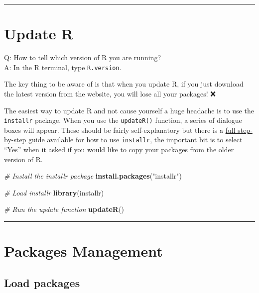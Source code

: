 \documentclass[
  a4paper,
  twoside,
  openright]{book}
\newenvironment{Shaded}{\begin{snugshade}}{\end{snugshade}}
\newcommand{\CommentTok}[1]{\textcolor[rgb]{0.56,0.35,0.01}{\textit{#1}}}
\newcommand{\FunctionTok}[1]{\textcolor[rgb]{0.13,0.29,0.53}{\textbf{#1}}}
\newcommand{\NormalTok}[1]{#1}
\newcommand{\StringTok}[1]{\textcolor[rgb]{0.31,0.60,0.02}{#1}}
\theoremstyle{definition}
\theoremstyle{definition}
\theoremstyle{definition}
\theoremstyle{definition}
\theoremstyle{remark}
\begin{document}
\begin{center}\rule{0.5\linewidth}{0.5pt}\end{center}

\section{Update R}\label{update-r}

Q: How to tell which version of R you are running?\\
A: In the R terminal, type \texttt{R.version}.

The key thing to be aware of is that when you update R, {if you just download the latest version from the website, you will lose all your packages!} ❌

The easiest way to update R and not cause yourself a huge headache is to use the \texttt{installr} package. When you use the \texttt{updateR()} function, a series of dialogue boxes will appear. These should be fairly self-explanatory but there is a \href{https://www.r-statistics.com/2015/06/a-step-by-step-screenshots-tutorial-for-upgrading-r-on-windows/\#google_vignette}{full step-by-step guide} available for how to use \texttt{installr}, the important bit is to {select ``Yes'' when it asked if you would like to copy your packages from the older version of R}.

\begin{Shaded}
\begin{Highlighting}[]
\CommentTok{\# Install the installr package}
\FunctionTok{install.packages}\NormalTok{(}\StringTok{"installr"}\NormalTok{)}

\CommentTok{\# Load installr}
\FunctionTok{library}\NormalTok{(installr)}

\CommentTok{\# Run the update function}
\FunctionTok{updateR}\NormalTok{()}
\end{Highlighting}
\end{Shaded}

\begin{center}\rule{0.5\linewidth}{0.5pt}\end{center}

\section{Packages Management}\label{packages-management}

\subsection{Load packages}\label{load-packages}
\end{document}
